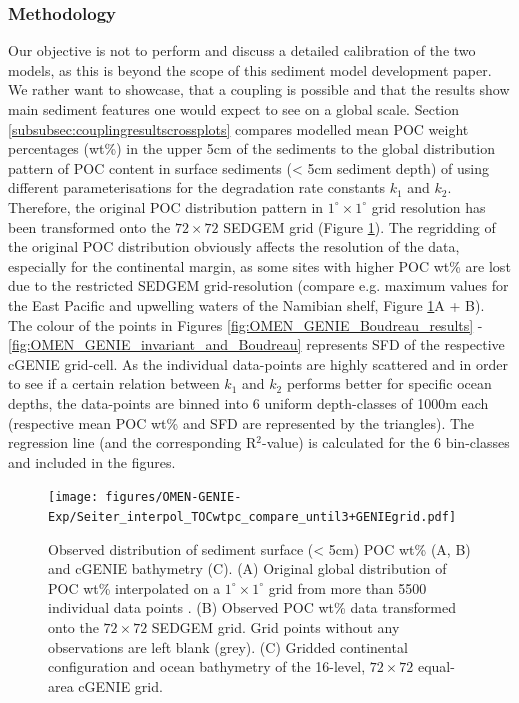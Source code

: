 \documentclass[gmd, manuscript]{copernicus}
\begin{document}
\subsubsection{Methodology}
Our objective is not to perform and discuss a detailed calibration of the two models, as this is beyond the scope of this sediment model development paper. We rather want to showcase, that a coupling is
possible and that the results show main sediment features one would expect to see on a global scale. 
Section \ref{subsubsec:couplingresultscrossplots} compares modelled mean POC weight percentages (wt\%) in the upper 5cm of the sediments to the global distribution pattern of POC content in surface sediments 
(< 5cm sediment depth) of \citet{seiter_organic_2004} using different parameterisations for the degradation rate constants $k_1$ and $k_2$. 
Therefore, the original POC distribution pattern in $1^\circ \times 1^\circ$ grid resolution \citep[interpolated from > 5500 measurements, compare][]{seiter_organic_2004} has been transformed onto the $72\times 72$ SEDGEM grid 
(Figure \ref{fig:TOC_Obs_regridded}). The regridding of the original POC distribution obviously affects the resolution of the data, especially for the continental margin, as some sites with higher POC wt\% are lost due to the 
restricted SEDGEM grid-resolution (compare e.g. maximum values for the East Pacific and upwelling waters of the Namibian shelf, Figure \ref{fig:TOC_Obs_regridded}A + B). 
The colour of the points in Figures \ref{fig:OMEN_GENIE_Boudreau_results} - \ref{fig:OMEN_GENIE_invariant_and_Boudreau} represents SFD of the respective cGENIE grid-cell. As the individual data-points are highly scattered and 
in order to see if a certain relation between $k_1$ and $k_2$ performs better for specific ocean depths, the data-points are binned into 6 uniform depth-classes of 1000m each (respective mean POC wt\% and SFD are represented by 
the triangles). The regression line (and the corresponding R$^2$-value) is calculated for the 6 bin-classes and included in the figures.

\begin{figure}[htbp]
\begin{center}
	\texttt{[image: figures/OMEN-GENIE-Exp/Seiter\_interpol\_TOCwtpc\_compare\_until3+GENIEgrid.pdf]}
	\caption{Observed distribution of sediment surface (< 5cm) POC wt\% (A, B) and cGENIE bathymetry (C). 
	(A) Original global distribution of POC wt\% interpolated on a $1^\circ \times 1^\circ$ grid from more than 5500 individual data points 
	\citep[compare][for the interpolation procedure]{seiter_organic_2004}. 
	(B) Observed POC wt\% data transformed onto the $72\times 72$ SEDGEM grid. Grid points without any observations are left blank (grey). 
	(C) Gridded continental configuration and ocean bathymetry of the 16-level, $72\times 72$ equal-area cGENIE grid.
	}\label{fig:TOC_Obs_regridded}
\end{center}
\end{figure}
\end{document}
